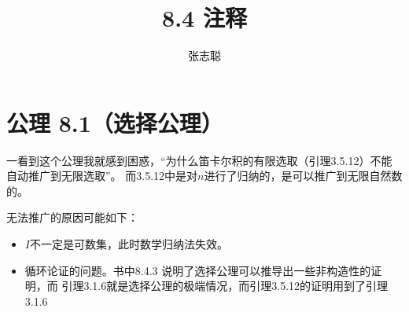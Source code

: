 \documentclass{article}
\begin{document}
\title{8.4 注释}
\author{张志聪}
\maketitle

\section*{公理 8.1（选择公理）}

一看到这个公理我就感到困惑，“为什么笛卡尔积的有限选取（引理3.5.12）不能自动推广到无限选取”。
而3.5.12中是对$n$进行了归纳的，是可以推广到无限自然数的。

无法推广的原因可能如下：

\begin{itemize}
  \item $I$不一定是可数集，此时数学归纳法失效。
  \item 循环论证的问题。书中8.4.3 说明了选择公理可以推导出一些$\textbf{非构造性}$的证明，而
        引理3.1.6就是选择公理的极端情况，而引理3.5.12的证明用到了引理3.1.6
\end{itemize}
\end{document}
